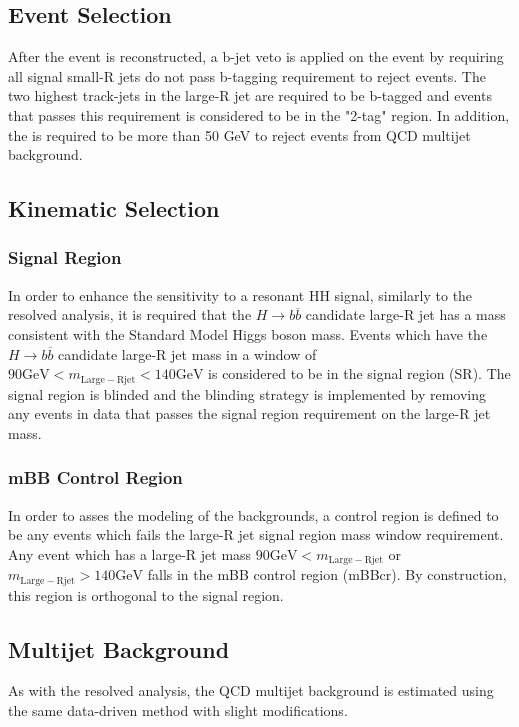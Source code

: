 \subsection{Event Selection}
\label{sec:boosted_selection}
After the event is reconstructed, a b-jet veto is applied on the event by requiring all signal small-R jets do not pass b-tagging requirement to reject \ttbar events. The two highest \pT track-jets in the large-R jet are required to be b-tagged and events that passes this requirement is considered to be in the "2-tag" region. In addition, the \met is required to be more than 50 GeV to reject events from QCD multijet background.%

\subsection{Kinematic Selection}
\subsubsection{Signal Region}
\label{sec:boosted_regiondefs}
In order to enhance the sensitivity to a resonant HH signal, similarly to the resolved analysis, it is required
that the ${H\rightarrow b\overline{b}}$ candidate large-R jet has a mass consistent with the Standard Model Higgs boson mass.
Events which have the ${H\rightarrow b\overline{b}}$ candidate large-R jet mass in a window of ${90 \mathrm{GeV} < m_{\mathrm{Large-R jet}} < 140 \mathrm{GeV}}$ is considered to be in the signal region (SR).
The signal region is blinded and the blinding strategy is implemented by removing any events in data that passes the signal region requirement on the large-R jet mass.

\subsubsection{mBB Control Region}
In order to asses the modeling of the backgrounds, a control region is defined to be any events which fails the large-R jet signal region mass window requirement. Any event which has a large-R jet mass
 ${90 \mathrm{GeV} < m_{\mathrm{Large-R jet}}}$
 or ${m_{\mathrm{Large-R jet}} > 140 \mathrm{GeV}}$ 
 falls in the mBB control region (mBBcr). By construction, this region is orthogonal to the signal region.

\subsection{Multijet Background}
As with the resolved analysis, the QCD multijet background is estimated using the same data-driven method with slight modifications. 
 
